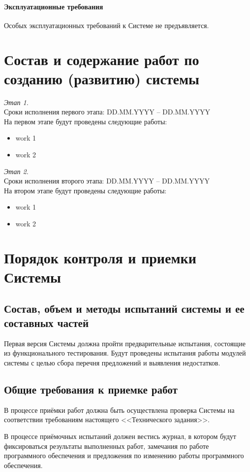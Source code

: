 \subsubsection{Эксплуатационные требования}
Особых эксплуатационных требований к Системе не предъявляется.

\chapter{Состав и содержание работ по созданию (развитию) системы}
\emph{Этап 1.}\\
Сроки исполнения первого этапа: DD.MM.YYYY -- DD.MM.YYYY\\
На первом этапе будут проведены следующие работы:
\begin{itemize}
    \item work 1
    \item work 2
\end{itemize}

\emph{Этап 2.}\\
Сроки исполнения второго этапа: DD.MM.YYYY -- DD.MM.YYYY\\
На втором этапе будут проведены следующие работы:
\begin{itemize}
    \item work 1
    \item work 2
\end{itemize}

\chapter{Порядок контроля и приемки Системы}
\section{Состав, объем и методы испытаний системы и ее составных частей}
Первая версия Системы должна пройти предварительные испытания, состоящие из функционального 
тестирования. Будут проведены испытания работы модулей системы с целью сбора перечня 
предложений и выявления недостатков. 

\section{Общие требования к приемке работ}
В процессе приёмки работ должна быть осуществлена проверка Системы на соответствии требованиям 
настоящего <<Технического задания>>.

В процессе приёмочных испытаний должен вестись журнал, в котором будут фиксироваться результаты 
выполненных работ, замечания по работе программного обеспечения и предложения по изменению работы 
программного обеспечения.

